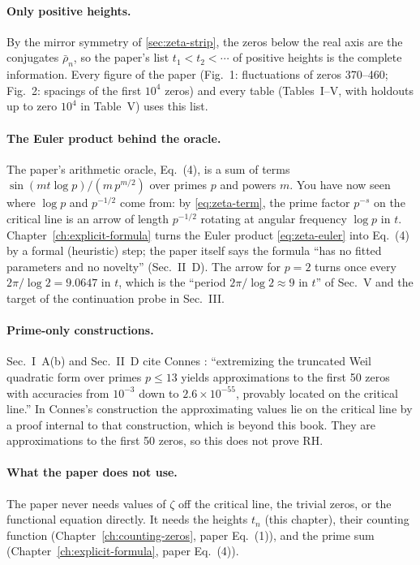 \paragraph{Only positive heights.} By the mirror symmetry of \cref{sec:zeta-strip}, the zeros below the real axis are the conjugates $\bar\rho_n$, so the paper's list $t_1<t_2<\cdots$ of positive heights is the complete information. Every figure of the paper (Fig.~1: fluctuations of zeros 370--460; Fig.~2: spacings of the first $10^4$ zeros) and every table (Tables~I--V, with holdouts up to zero $10^4$ in Table~V) uses this list.

\paragraph{The Euler product behind the oracle.} The paper's arithmetic oracle, Eq.~(4), is a sum of terms $\sin(mt\log p)/(m\,p^{m/2})$ over primes $p$ and powers $m$. You have now seen where $\log p$ and $p^{-1/2}$ come from: by \cref{eq:zeta-term}, the prime factor $p^{-s}$ on the critical line is an arrow of length $p^{-1/2}$ rotating at angular frequency $\log p$ in $t$. Chapter~\ref{ch:explicit-formula} turns the Euler product \cref{eq:zeta-euler} into Eq.~(4) by a formal (heuristic) step; the paper itself says the formula ``has no fitted parameters and no novelty'' (Sec.~II~D). The arrow for $p=2$ turns once every $2\pi/\log 2=9.0647$ in $t$, which is the ``period $2\pi/\log 2\approx 9$ in $t$'' of Sec.~V and the target of the continuation probe in Sec.~III.

\paragraph{Prime-only constructions.} Sec.~I~A(b) and Sec.~II~D cite Connes \cite{connes26}: ``extremizing the truncated Weil quadratic form over primes $p\le13$ yields approximations to the first 50 zeros with accuracies from $10^{-3}$ down to $2.6\times10^{-55}$, provably located on the critical line.'' In Connes's construction the approximating values lie on the critical line by a proof internal to that construction, which is beyond this book. They are approximations to the first 50 zeros, so this does not prove RH.

\paragraph{What the paper does not use.} The paper never needs values of $\zeta$ off the critical line, the trivial zeros, or the functional equation directly. It needs the heights $t_n$ (this chapter), their counting function (Chapter~\ref{ch:counting-zeros}, paper Eq.~(1)), and the prime sum (Chapter~\ref{ch:explicit-formula}, paper Eq.~(4)).

